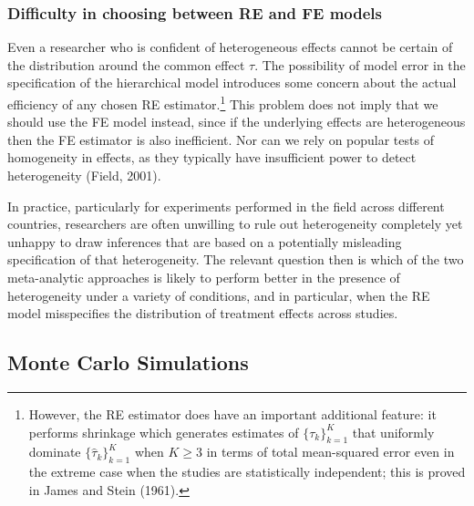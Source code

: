 \documentclass[12pt]{article}
\begin{document}
\subsubsection*{Difficulty in choosing between RE and FE models}
Even a researcher who is confident of heterogeneous effects cannot be certain of the distribution around the common effect $\tau$. The possibility of model error in the specification of the hierarchical model introduces some concern about the actual efficiency of any chosen RE estimator.\footnote{However, the RE estimator does have an important additional feature: 
it performs shrinkage which generates estimates of  $\{{\tau}_k\}_{k=1}^K$ that uniformly dominate $\{\hat{\tau}_k\}_{k=1}^K$ when $K \geq 3$ in terms of total mean-squared error even in the extreme case when the studies are statistically independent; this is proved in James and Stein (1961).} This problem does not imply that we should use the FE model instead, since if the underlying effects are heterogeneous then the FE estimator is also inefficient. Nor can we rely on popular tests of homogeneity in effects, as they typically have insufficient power to detect heterogeneity (Field, 2001). 

In practice, particularly for experiments performed in the field across different countries, researchers are often unwilling to rule out heterogeneity completely yet unhappy to draw inferences that are based on a potentially misleading specification of that heterogeneity. The relevant question then is which of the two meta-analytic approaches is likely to perform better in the presence of heterogeneity under a variety of conditions, and in particular, when the RE model misspecifies the distribution of treatment effects across studies.




\subsection{Monte Carlo Simulations} \label{section:simulations}


\end{document}
